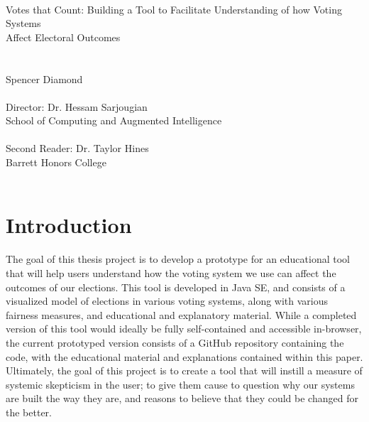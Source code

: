 \documentclass[12pt]{article}
\begin{document}
\begin{center}
\quad \\
\quad \\
\quad \\
\quad \\
\quad \\
\quad \\
\quad \\
\quad \\
\quad \\
\quad \\
\quad \\
\LARGE Votes that Count: Building a Tool to Facilitate Understanding of how Voting Systems\\ Affect Electoral Outcomes\\ \normalsize
\quad \\
\quad \\
Spencer Diamond\\
\quad \\
Director: Dr. Hessam Sarjougian\\
School of Computing and Augmented Intelligence\\
\quad \\
Second Reader: Dr. Taylor Hines\\
Barrett Honors College\\
\quad \\
\end{center}
\newpage
\tableofcontents
\newpage

\setcounter{page}{1}
\section{Introduction}
\qquad The goal of this thesis project is to develop a prototype for an educational tool that will help users understand how the voting system we use can affect the outcomes of our elections. This tool is developed in Java SE, and consists of a visualized model of elections in various voting systems, along with various fairness measures, and educational and explanatory material. While a completed version of this tool would ideally be fully self-contained and accessible in-browser, the current prototyped version consists of a GitHub repository containing the code, with the educational material and explanations contained within this paper. Ultimately, the goal of this project is to create a tool that will instill a measure of systemic skepticism in the user; to give them cause to question why our systems are built the way they are, and reasons to believe that they could be changed for the better. \\
\end{document}
